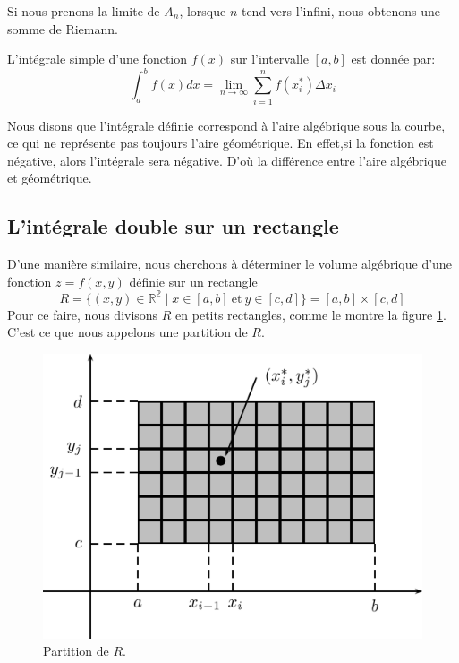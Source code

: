\documentclass[]{book}
\theoremstyle{definition}
\theoremstyle{definition}
\theoremstyle{definition}
\theoremstyle{remark}
\let\BeginKnitrBlock\begin \let\EndKnitrBlock\end
\begin{document}
Si nous prenons la limite de \(A_n\), lorsque \(n\) tend vers l'infini,
nous obtenons une somme de Riemann.
\BeginKnitrBlock{definition}[L'intégrale simple]
\protect\hypertarget{def:unnamed-chunk-238}{}{\label{def:unnamed-chunk-238}
{} }L'intégrale simple d'une fonction
\(f(x)\) sur l'intervalle \([a,b]\) est donnée par:
\[ \int_a^b f(x)dx = \lim_{n\to\infty}\sum_{i=1}^n f(x_i^*)\Delta x_i\]
\EndKnitrBlock{definition}

\BeginKnitrBlock{remark}
{}Nous disons que l'intégrale définie
correspond à l'aire algébrique sous la courbe, ce qui ne représente pas
toujours l'aire géométrique. En effet,si la fonction est négative, alors
l'intégrale sera négative. D'où la différence entre l'aire algébrique et
géométrique.
\EndKnitrBlock{remark}

\hypertarget{lintegrale-double-sur-un-rectangle}{%
\subsection{L'intégrale double sur un
rectangle}\label{lintegrale-double-sur-un-rectangle}}

D'une manière similaire, nous cherchons à déterminer le volume
algébrique d'une fonction \(z=f(x,y)\) définie sur un rectangle
\[R=\{(x,y)\in\mathbb{R^2}\mid x\in [a,b]\ \text{et}\ y\in[c,d]\}=[a,b]\times[c,d]\]
Pour ce faire, nous divisons \(R\) en petits rectangles, comme le montre
la figure \ref{fig:partitionR2}. C'est ce que nous appelons une
partition de \(R\).

\begin{figure}

{\centering \includegraphics[width=0.75\linewidth]{resources/images/latex/partitionR2} 

}

\caption{Partition de $R$.}\label{fig:partitionR2}
\end{figure}
\end{document}

